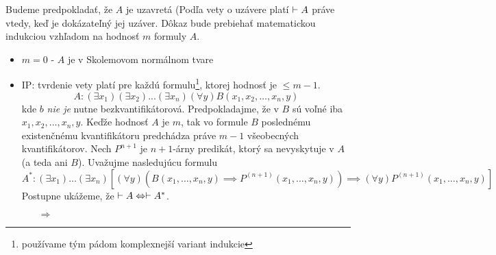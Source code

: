 \begin{dokaz}
    Budeme predpokladať, že $A$ je uzavretá (Podľa vety o uzávere
    platí $\vdash A$ práve vtedy, keď je dokázateľný jej uzáver.
    Dôkaz bude prebiehať matematickou indukciou vzhľadom na hodnosť
    $m$ formuly $A$.
    \begin{itemize}
        \item $m=0$ - $A$ je v Skolemovom normálnom tvare
        \item IP: tvrdenie vety platí pre každú
        formulu\footnote{používame tým pádom komplexnejší variant
        indukcie}, ktorej hodnosť je $\le m-1$.
        \begin{equation}
            A: (\exists x_1) (\exists x_2) ... (\exists x_n) (\forall y)
            B(x_1,x_2,\dots,x_n,y)
        \end{equation}
        kde $b$ \emph{nie je} nutne bezkvantifikátorová.
        Predpokladajme, že v $B$ sú voľné iba $x_1,x_2,\dots,x_n,y$.
        Keďže hodnosť $A$ je $m$, tak vo formule $B$ poslednému
        existenčnému kvantifikátoru predchádza práve $m-1$ všeobecných
        kvantifikátorov.
        Nech $P^{n+1}$ je $n+1$-árny predikát, ktorý sa nevyskytuje v
        $A$ (a teda ani $B$). Uvažujme nasledujúcu formulu
        \begin{equation}
            A^*: (\exists x_1) \dots (\exists x_n) \left[
                (\forall y) (B(x_1,\dots,x_n,y) \implies 
                    P^{(n+1)}(x_1,\dots,x_n,y)) \implies 
                    (\forall y) P^{(n+1)} (x_1,\dots,x_n,y)
            \right]
        \end{equation}
        Postupne ukážeme, že $\vdash A \Leftrightarrow \vdash
        A^*$.
        \begin{itemize}
        \item[$\Rightarrow$]
\end{itemize}
\end{itemize}
\end{dokaz}
